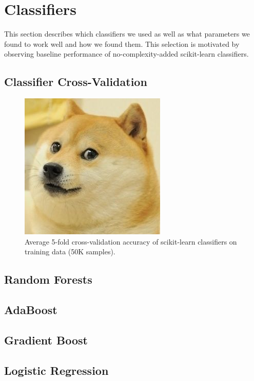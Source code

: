 \documentclass{article}
\begin{document}

\section{Classifiers}

This section describes which classifiers we used as well as what parameters we found to work well and how we found them. 
This selection is motivated by observing baseline performance of no-complexity-added scikit-learn classifiers.

\subsection{Classifier Cross-Validation}

\begin{figure}[!h]
\centering
\includegraphics{placeholder}
\caption{Average 5-fold cross-validation accuracy of scikit-learn classifiers on training data (50K samples).}
\label{fig:placeholder}
\end{figure}



 
\subsection{Random Forests}

\subsection{AdaBoost}

\subsection{Gradient Boost}

\subsection{Logistic Regression}
\end{document}
